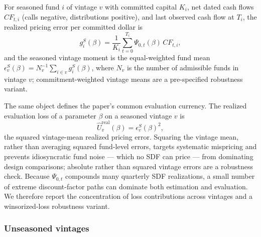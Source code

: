 \documentclass[11pt]{article}
\begin{document}
For seasoned fund $i$ of vintage $v$ with committed capital $K_i$, net dated
cash flows $CF_{t,i}$ (calls negative, distributions positive), and last
observed cash flow at $T_i$, the realized pricing error per committed dollar
is
\[
g_i^S(\beta)
=
\frac{1}{K_i}\sum_{t=0}^{T_i}\Psi_{0,t}(\beta)\,CF_{t,i},
\]
and the seasoned vintage moment is the equal-weighted fund mean
$\epsilon_v^S(\beta)=N_v^{-1}\sum_{i\in v}g_i^S(\beta)$, where $N_v$ is the
number of admissible funds in vintage $v$; commitment-weighted vintage means
are a pre-specified robustness variant.

The same object defines the paper's common evaluation currency. The realized
evaluation loss of a parameter $\beta$ on a seasoned vintage $v$ is
\[
\widehat U_v^{\mathrm{real}}(\beta)=\epsilon_v^S(\beta)^2,
\]
the squared vintage-mean realized pricing error. Squaring the vintage mean,
rather than averaging squared fund-level errors, targets systematic
mispricing and prevents idiosyncratic fund noise --- which no SDF can price
--- from dominating design comparisons; absolute rather than squared vintage
errors are a robustness check. Because $\Psi_{0,t}$ compounds many quarterly
SDF realizations, a small number of extreme discount-factor paths can
dominate both estimation and evaluation. We therefore report the
concentration of loss contributions across vintages and a winsorized-loss
robustness variant.

\subsubsection{Unseasoned vintages}
\end{document}
